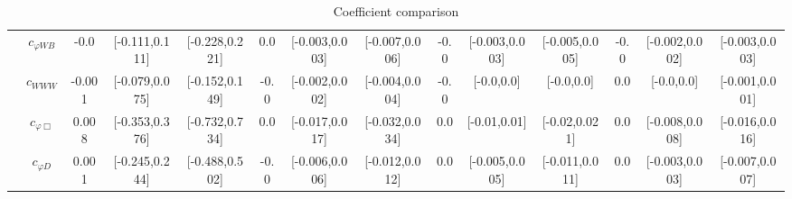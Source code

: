 \documentclass{article}
\begin{document}
\begin{table}[H]
\begin{tabular}{|c|c|c|c|c|c|c|c|c|c|c|c|c|c|}
 & $c_{\varphi WB}$ & -0.0                             & [-0.111,0.111]                                 & [-0.228,0.221] & 0.0                             & [-0.003,0.003]                                 & [-0.007,0.006] & -0.0                             & [-0.003,0.003]                                 & [-0.005,0.005] & -0.0                             & [-0.002,0.002]                                 & [-0.003,0.003] \\ \cline{2-14}
 & $c_{WWW}$ & -0.001                             & [-0.079,0.075]                                 & [-0.152,0.149] & -0.0                             & [-0.002,0.002]                                 & [-0.004,0.004] & -0.0                             & [-0.0,0.0]                                 & [-0.0,0.0] & 0.0                             & [-0.0,0.0]                                 & [-0.001,0.001] \\ \cline{2-14}
 & $c_{\varphi \Box}$ & 0.008                             & [-0.353,0.376]                                 & [-0.732,0.734] & 0.0                             & [-0.017,0.017]                                 & [-0.032,0.034] & 0.0                             & [-0.01,0.01]                                 & [-0.02,0.021] & 0.0                             & [-0.008,0.008]                                 & [-0.016,0.016] \\ \cline{2-14}
 & $c_{\varphi D}$ & 0.001                             & [-0.245,0.244]                                 & [-0.488,0.502] & -0.0                             & [-0.006,0.006]                                 & [-0.012,0.012] & 0.0                             & [-0.005,0.005]                                 & [-0.011,0.011] & 0.0                             & [-0.003,0.003]                                 & [-0.007,0.007] \\ \cline{2-14}
\hline
\end{tabular}
\caption{Coefficient comparison}
\end{table}
\end{document}
